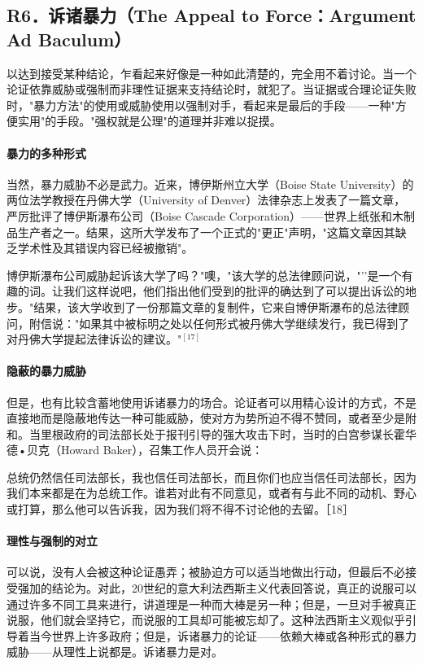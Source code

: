 \subsection{R6．诉诸暴力（The Appeal to Force：Argument Ad Baculum）}

\begin{theorembox}[title=诉诸暴力谬误的定义]
以达到接受某种结论，乍看起来好像是一种如此清楚的，完全用不着讨论。当一个论证依靠威胁或强制而非理性证据来支持结论时，就犯了。当证据或合理论证失败时，"暴力方法"的使用或威胁使用以强制对手，看起来是最后的手段——一种"方便实用"的手段。"强权就是公理"的道理并非难以捉摸。
\end{theorembox}

\paragraph{暴力的多种形式}
\begin{examplebox}[title=法律威胁案例]
当然，暴力威胁不必是武力。近来，博伊斯州立大学（Boise State University）的两位法学教授在丹佛大学（University of Denver）法律杂志上发表了一篇文章，严厉批评了博伊斯瀑布公司（Boise Cascade Corporation）——世界上纸张和木制品生产者之一。结果，这所大学发布了一个正式的"更正"声明，"这篇文章因其缺乏学术性及其错误内容已经被撤销"。

博伊斯瀑布公司威胁起诉该大学了吗？"噢，"该大学的总法律顾问说，"''是一个有趣的词。让我们这样说吧，他们指出他们受到的批评的确达到了可以提出诉讼的地步。"结果，该大学收到了一份那篇文章的复制件，它来自博伊斯瀑布的总法律顾问，附信说："如果其中被标明之处以任何形式被丹佛大学继续发行，我已得到了对丹佛大学提起法律诉讼的建议。"${ }^{[17]}$
\end{examplebox}

\paragraph{隐蔽的暴力威胁}
但是，也有比较含蓄地使用诉诸暴力的场合。论证者可以用精心设计的方式，不是直接地而是隐蔽地传达一种可能威胁，使对方为势所迫不得不赞同，或者至少是附和。当里根政府的司法部长处于报刊引导的强大攻击下时，当时的白宫参谋长霍华德•贝克（Howard Baker），召集工作人员开会说：

\begin{displayquote}
总统仍然信任司法部长，我也信任司法部长，而且你们也应当信任司法部长，因为我们本来都是在为总统工作。谁若对此有不同意见，或者有与此不同的动机、野心或打算，那么他可以告诉我，因为我们将不得不讨论他的去留。［18］
\end{displayquote}

\paragraph{理性与强制的对立}
可以说，没有人会被这种论证愚弄；被胁迫方可以适当地做出行动，但最后不必接受强加的结论为。对此，20世纪的意大利法西斯主义代表回答说，真正的说服可以通过许多不同工具来进行，讲道理是一种而大棒是另一种；但是，一旦对手被真正说服，他们就会坚持它，而说服的工具却可能被忘却了。这种法西斯主义观似乎引导着当今世界上许多政府；但是，诉诸暴力的论证——依赖大棒或各种形式的暴力威胁——从理性上说都是。诉诸暴力是对。